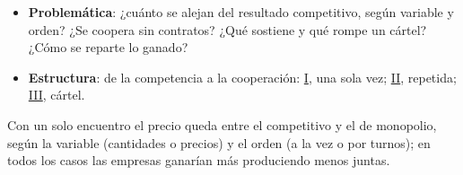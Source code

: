 \documentclass{article}
\begin{document}
\begin{columnas}
\begin{itemize}
\begin{itemize}
\begin{itemize}
    \item \emph{por el instrumento}: acuerdos vinculantes.
    \item {}: resultado cooperativo de un juego \emph{no} cooperativo; : el caso cooperativo.
    \end{itemize}
  \end{itemize}
\item \textbf{Problemática}: ¿cuánto se alejan del resultado competitivo, según variable y orden? ¿Se coopera sin contratos? ¿Qué sostiene y qué rompe un cártel? ¿Cómo se reparte lo ganado?
\item \textbf{Estructura}: de la competencia a la cooperación: \hyperref[rep:I]{I}, una sola vez; \hyperref[rep:II]{II}, repetida; \hyperref[rep:III]{III}, cártel.
\end{itemize}

\begin{ideaclave}
Con un solo encuentro el precio queda entre el competitivo y el de monopolio, según la variable (cantidades o precios) y el orden (a la vez o por turnos); en todos los casos las empresas ganarían más produciendo menos juntas.
\end{ideaclave}


\end{columnas}
\end{document}
